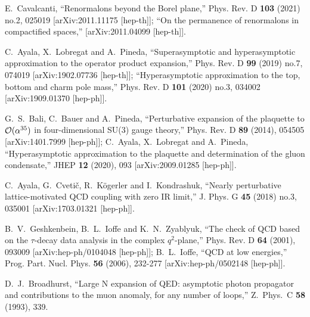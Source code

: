 \documentclass[aps,nofootinbib,showkeys,noshowpacs,preprintnumbers,amsmath,amssymb]{revtex4}
\begin{document}
\begin{thebibliography}{99}
E.~Cavalcanti,
``Renormalons beyond the Borel plane,''
Phys. Rev. D \textbf{103} (2021) no.2, 025019
[arXiv:2011.11175 [hep-th]];
``On the permanence of renormalons in compactified spaces,''
[arXiv:2011.04099 [hep-th]].

C.~Ayala, X.~Lobregat and A.~Pineda,
``Superasymptotic and hyperasymptotic approximation to the operator product expansion,''
Phys. Rev. D \textbf{99} (2019) no.7, 074019
[arXiv:1902.07736 [hep-th]];
``Hyperasymptotic approximation to the top, bottom and charm pole mass,''
Phys. Rev. D \textbf{101} (2020) no.3, 034002
[arXiv:1909.01370 [hep-ph]].

G.~S.~Bali, C.~Bauer and A.~Pineda,
``Perturbative expansion of the plaquette to ${\cal O}(\alpha^{35})$ in four-dimensional SU(3) gauge theory,''
Phys. Rev. D \textbf{89} (2014), 054505
[arXiv:1401.7999 [hep-ph]];
C.~Ayala, X.~Lobregat and A.~Pineda,
``Hyperasymptotic approximation to the plaquette and determination of the gluon condensate,''
JHEP \textbf{12} (2020), 093
[arXiv:2009.01285 [hep-ph]].

  C.~Ayala, G.~Cveti\v{c}, R.~K\"ogerler and I.~Kondrashuk,
  ``Nearly perturbative lattice-motivated QCD coupling with zero IR limit,''
 J. Phys. G \textbf{45} (2018) no.3, 035001
[arXiv:1703.01321 [hep-ph]].

B.~V.~Geshkenbein, B.~L.~Ioffe and K.~N.~Zyablyuk,
``The check of QCD based on the $\tau$-decay data analysis in the complex $q^2$-plane,''
Phys. Rev. D \textbf{64} (2001), 093009
[arXiv:hep-ph/0104048 [hep-ph]];
B.~L.~Ioffe,
``QCD at low energies,''
Prog. Part. Nucl. Phys. \textbf{56} (2006), 232-277
[arXiv:hep-ph/0502148 [hep-ph]].


  D.~J.~Broadhurst,
  ``Large N expansion of QED: asymptotic photon propagator and contributions to the muon anomaly, for any number of loops,''
  Z.\ Phys.\ C {\bf 58} (1993), 339.
  

\end{thebibliography}
\end{document}
